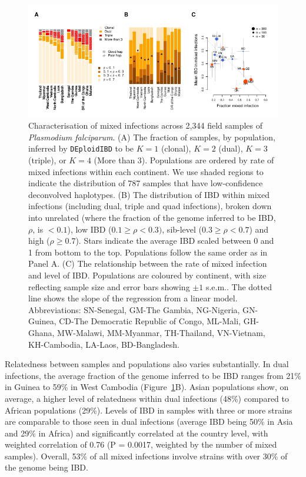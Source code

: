 \documentclass[9pt,lineno]{elife}
\begin{document}
\begin{figure}[htp]
  \begin{center}
    \includegraphics[width=\textwidth]{Fig4.pdf}
    \caption{Characterisation of mixed infections across 2,344 field samples of {\it Plasmodium falciparum}. (A) The fraction of samples, by population, inferred by \texttt{DEploidIBD} to be $K=1$ (clonal), $K=2$ (dual), $K=3$ (triple), or $K=4$ (More than 3).  Populations are ordered by rate of mixed infections within each continent. We use shaded regions to indicate the distribution of 787 samples that have low-confidence deconvolved haplotypes.  (B) The distribution of IBD within mixed infections (including dual, triple and quad infections), broken down into unrelated (where the fraction of the genome inferred to be IBD, $\rho$, is $< 0.1$), low IBD ($0.1 \geq \rho < 0.3)$, sib-level ($0.3 \geq \rho <0.7$) and high ($\rho \geq 0.7$). Stars indicate the average IBD scaled between 0 and 1 from bottom to the top.  Populations follow the same order as in Panel A.  (C) The relationship between the rate of mixed infection and level of IBD. Populations are coloured by continent, with size reflecting sample size and error bars showing $\pm 1$ s.e.m..  The dotted line shows the slope of the regression from a linear model.  Abbreviations: SN-Senegal, GM-The Gambia, NG-Nigeria, GN-Guinea, CD-The Democratic Republic of Congo, ML-Mali, GH-Ghana, MW-Malawi, MM-Myanmar, TH-Thailand, VN-Vietnam, KH-Cambodia, LA-Laos, BD-Bangladesh.} \label{fig:mixInfPlot}
  \end{center}
\end{figure}

Relatedness between samples and populations also varies substantially.  In dual infections, the average fraction of the genome inferred to be IBD ranges from 21\% in Guinea to 59\% in West Cambodia (Figure~\ref{fig:mixInfPlot}B).  Asian populations show, on average, a higher level of relatedness within dual infections (48\%) compared to African populations (29\%).  Levels of IBD in samples with three or more strains are comparable to those seen in dual infections (average IBD being 50\% in Asia and 29\% in Africa) and significantly correlated at the country level, with weighted correlation of 0.76 (P = 0.0017, weighted by the number of mixed samples).  Overall, 53\% of all mixed infections involve strains with over 30\% of the genome being IBD.
\end{document}
